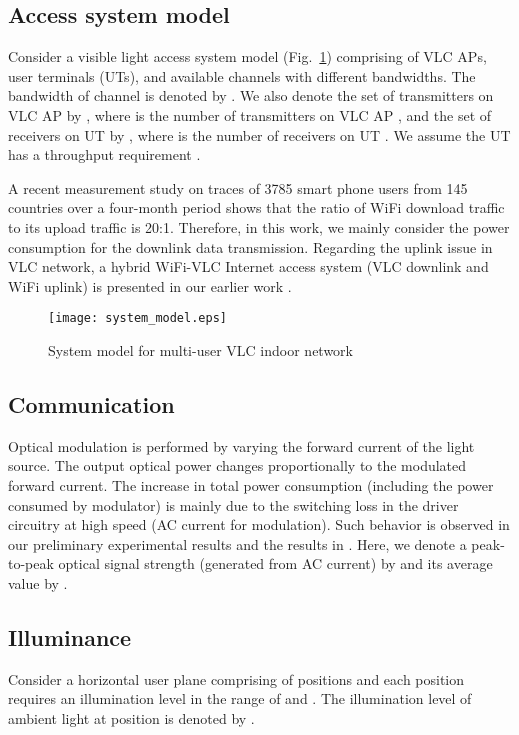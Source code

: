 \documentclass[10pt,journal]{IEEEtran}
\begin{document}
\subsection{Access system model}
Consider a visible light access system model (Fig.~\ref{fig_system_model}) comprising of  VLC APs,  user terminals (UTs), and  available channels with different bandwidths. The bandwidth of channel  is denoted by . We also denote the set of transmitters on VLC AP  by , where  is the number of transmitters on VLC AP , and the set of receivers on UT  by , where  is the number of receivers on UT . We assume the UT  has a throughput requirement .

A recent measurement study \cite{ding2013characterizing} on traces of 3785 smart phone users from 145 countries over a four-month period shows that the ratio of WiFi download traffic to its upload traffic is 20:1. Therefore, in this work, we mainly consider the power consumption for the downlink data transmission. Regarding the uplink issue in VLC network, a hybrid WiFi-VLC Internet access system (VLC downlink and WiFi uplink) is presented in our earlier work \cite{shao2014indoor,shao2015analysis,shao2015design}.

\begin{figure}
\centering
\texttt{[image: system\_model.eps]}
\caption{System model for multi-user VLC indoor network}
\vspace{-12pt}
\label{fig_system_model}
\end{figure}



\subsection{Communication}
Optical modulation is performed by varying the forward current of the light source. The output optical power changes proportionally to the modulated forward current. The increase in total power consumption (including the power consumed by modulator) is mainly due to the switching loss in the driver circuitry at high speed (AC current for modulation). Such behavior is observed in our preliminary experimental results and the results in \cite{hsu2005optimization}. Here, we denote a peak-to-peak optical signal strength (generated from AC current) by  and its average value by .

\subsection{Illuminance}
Consider a horizontal user plane comprising of  positions and each position requires an illumination level in the range of  and . The illumination level of ambient light at position  is denoted by .
\end{document}
